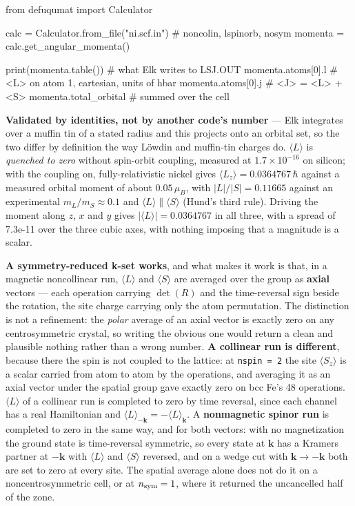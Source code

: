 \documentclass[11pt,a4paper]{article}
\newcommand{\code}[1]{\texttt{\small #1}}
\begin{document}
\begin{pycode}
from defuqumat import Calculator

calc = Calculator.from_file("ni.scf.in")   # noncolin, lspinorb, nosym
momenta = calc.get_angular_momenta()

print(momenta.table())      # what Elk writes to LSJ.OUT
momenta.atoms[0].l          # <L> on atom 1, cartesian, units of hbar
momenta.atoms[0].j          # <J> = <L> + <S>
momenta.total_orbital       # summed over the cell
\end{pycode}

\textbf{Validated by identities, not by another code's number} --- Elk
integrates over a muffin tin of a stated radius and this projects onto an
orbital set, so the two differ by definition the way Löwdin and muffin-tin
charges do. $\langle L\rangle$ is \emph{quenched to zero} without spin-orbit
coupling, measured at $1.7\times10^{-16}$ on silicon; with the coupling on,
fully-relativistic nickel gives $\langle L_z\rangle = 0.0364767\,\hbar$ against a
measured orbital moment of about $0.05\,\mu_B$, with
$|L|/|S| = 0.11665$ against an experimental $m_L/m_S \approx 0.1$ and $\langle
L\rangle \parallel \langle S\rangle$ (Hund's third rule). Driving the moment
along $z$, $x$ and $y$ gives $|\langle L\rangle| = 0.0364767$ in all three,
with a spread of 7.3e-11 over the three cubic axes, with nothing imposing that a magnitude is a scalar.

\textbf{A symmetry-reduced k-set works}, and what makes it work is that, in
a magnetic noncollinear run, $\langle L\rangle$ and $\langle S\rangle$ are
averaged over the group as \textbf{axial} vectors --- each operation carrying $\det(R)$ and the
time-reversal sign beside the rotation, the site charge carrying only the atom
permutation. The distinction is not a refinement: the \emph{polar} average of an
axial vector is exactly zero on any centrosymmetric crystal, so writing the
obvious one would return a clean and plausible nothing rather than a wrong
number. \textbf{A collinear run is different}, because there the spin is not
coupled to the lattice: at \code{nspin = 2} the site $\langle S_z\rangle$ is a
scalar carried from atom to atom by the operations, and averaging it as an axial
vector under the spatial group gave exactly zero on bcc Fe's 48 operations.
$\langle L\rangle$ of a collinear run is completed to zero by time reversal,
since each channel has a real Hamiltonian and $\langle L\rangle_{-\mathbf k} =
-\langle L\rangle_{\mathbf k}$. A \textbf{nonmagnetic spinor run} is completed to zero in
the same way, and for both vectors: with no magnetization the ground state is
time-reversal symmetric, so every state at $\mathbf k$ has a Kramers partner at
$-\mathbf k$ with $\langle L\rangle$ and $\langle S\rangle$ reversed, and on a
wedge cut with $\mathbf k \to -\mathbf k$ both are set to zero at every site.
The spatial average alone does not do it on a noncentrosymmetric cell, or at
$n_{\rm sym} = 1$, where it returned the uncancelled half of the zone.
\end{document}
